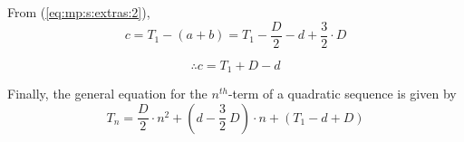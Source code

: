 {From (\ref{eq:mp:s:extras:2}),
\begin{equation*}
c = T_1 - (a + b) = T_1 - \frac{D}{2} - d + \frac{3}{2} \cdot D
\end{equation*}

\begin{equation}
\label{eq:mp:s:extras:8}
\therefore c = T_1 + D - d
\end{equation}

Finally, the general equation for the $n^{th}$-term of a quadratic sequence is
given by
\begin{equation}
\label{eq:mp:s:extras:9}
T_n = \frac{D}{2} \cdot {n^2} + (d - \frac {3} {2} \: D) \cdot n + (T_1 - d + D)
\end{equation}}


